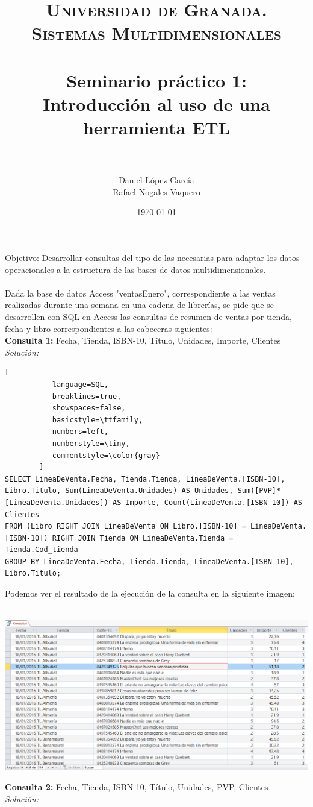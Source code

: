 \documentclass[paper=a4, fontsize=11pt, spanish]{scrartcl}
\title{
  \normalfont \normalsize 
  \textsc{Universidad de Granada.\\Sistemas Multidimensionales} \\ [25pt] %
  \horrule{0.5pt} \\[0.4cm] %
  \huge Seminario práctico 1: \\Introducción al uso de una herramienta ETL \\ %
  \horrule{2pt} \\[0.5cm] %
}
\author{Daniel López García\\Rafael Nogales Vaquero} %
\date{\normalsize\today} %
\numberwithin{equation}{section} %
\numberwithin{figure}{section} %
\numberwithin{table}{section} %
\begin{document}
\maketitle %
Objetivo: Desarrollar consultas del tipo de las necesarias para adaptar los datos operacionales a la estructura de las bases de datos multidimensionales.\\
\\
Dada la base de datos Access "ventasEnero", correspondiente a las ventas realizadas durante una semana en una cadena de librerías, se pide que se desarrollen con SQL en Access las consultas de resumen de ventas por tienda, fecha y libro correspondientes a las cabeceras siguientes:
\\
\textbf{Consulta 1:} Fecha, Tienda, ISBN-10, Título, Unidades, Importe, Clientes\\
\textit{Solución:}
\begin{lstlisting}[
           language=SQL,
           breaklines=true,
           showspaces=false,
           basicstyle=\ttfamily,
           numbers=left,
           numberstyle=\tiny,
           commentstyle=\color{gray}
        ]
SELECT LineaDeVenta.Fecha, Tienda.Tienda, LineaDeVenta.[ISBN-10], Libro.Titulo, Sum(LineaDeVenta.Unidades) AS Unidades, Sum([PVP]*[LineaDeVenta.Unidades]) AS Importe, Count(LineaDeVenta.[ISBN-10]) AS Clientes
FROM (Libro RIGHT JOIN LineaDeVenta ON Libro.[ISBN-10] = LineaDeVenta.[ISBN-10]) RIGHT JOIN Tienda ON LineaDeVenta.Tienda = Tienda.Cod_tienda
GROUP BY LineaDeVenta.Fecha, Tienda.Tienda, LineaDeVenta.[ISBN-10], Libro.Titulo;
\end{lstlisting}

Podemos ver el resultado de la ejecución de la consulta en la siguiente imagen:\\
\\
\begin{center}
	\includegraphics[scale=0.35]{1-zoom.png}
\end{center}
\textbf{Consulta 2:} Fecha, Tienda, ISBN-10, Título, Unidades, PVP, Clientes\\
\textit{Solución:}
\end{document}
